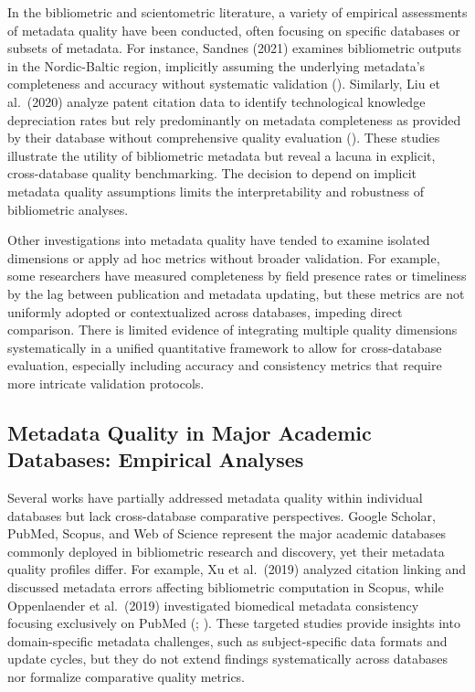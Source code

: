 \documentclass[
  12pt,
]{article}
\begin{document}
In the bibliometric and scientometric literature, a variety of empirical
assessments of metadata quality have been conducted, often focusing on
specific databases or subsets of metadata. For instance, Sandnes (2021)
examines bibliometric outputs in the Nordic-Baltic region, implicitly
assuming the underlying metadata's completeness and accuracy without
systematic validation ().
Similarly, Liu et al.~(2020) analyze patent citation data to identify
technological knowledge depreciation rates but rely predominantly on
metadata completeness as provided by their database without
comprehensive quality evaluation (). These studies illustrate the utility of bibliometric metadata
but reveal a lacuna in explicit, cross-database quality benchmarking.
The decision to depend on implicit metadata quality assumptions limits
the interpretability and robustness of bibliometric analyses.

Other investigations into metadata quality have tended to examine
isolated dimensions or apply ad hoc metrics without broader validation.
For example, some researchers have measured completeness by field
presence rates or timeliness by the lag between publication and metadata
updating, but these metrics are not uniformly adopted or contextualized
across databases, impeding direct comparison. There is limited evidence
of integrating multiple quality dimensions systematically in a unified
quantitative framework to allow for cross-database evaluation,
especially including accuracy and consistency metrics that require more
intricate validation protocols.

\subsection{Metadata Quality in Major Academic Databases: Empirical
Analyses}\label{metadata-quality-in-major-academic-databases-empirical-analyses}

Several works have partially addressed metadata quality within
individual databases but lack cross-database comparative perspectives.
Google Scholar, PubMed, Scopus, and Web of Science represent the major
academic databases commonly deployed in bibliometric research and
discovery, yet their metadata quality profiles differ. For example, Xu
et al.~(2019) analyzed citation linking and discussed metadata errors
affecting bibliometric computation in Scopus, while Oppenlaender et
al.~(2019) investigated biomedical metadata consistency focusing
exclusively on PubMed (;
). These
targeted studies provide insights into domain-specific metadata
challenges, such as subject-specific data formats and update cycles, but
they do not extend findings systematically across databases nor
formalize comparative quality metrics.
\end{document}
